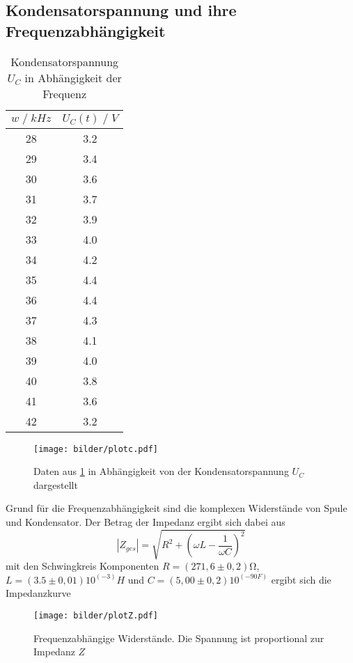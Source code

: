 \subsection{Kondensatorspannung und ihre Frequenzabhängigkeit}
\begin{table}
    \centering
    \begin{tabular}{c c}
        \toprule
        $w\;/\;kHz$ & $U_C(t)\;/\;V$\\
        \midrule
        28      &3.2\\
        29      &3.4\\
        30      &3.6\\
        31      &3.7\\
        32      &3.9\\
        33      &4.0\\
        34      &4.2\\
        35      &4.4\\
        36      &4.4\\
        37      &4.3\\
        38      &4.1\\
        39      &4.0\\
        40      &3.8\\
        41      &3.6\\
        42      &3.2\\
        \bottomrule
    \end{tabular}
    \caption{Kondensatorspannung $U_C$ in Abhängigkeit der Frequenz}
    \label{tab:tabelle_w}
\end{table}
\begin{figure}[H]
    \centering
    \texttt{[image: bilder/plotc.pdf]}
    \caption{
        Daten aus \ref{tab:tabelle_w} in Abhängigkeit von der Kondensatorspannung $U_C$ dargestellt
    }
\end{figure}
Grund für die Frequenzabhängigkeit sind die komplexen Widerstände von Spule und Kondensator.
Der Betrag der Impedanz ergibt sich dabei aus
\begin{equation}
    |Z_{ges}|=\sqrt{R^2+(\omega L-\frac{1}{\omega C})^2}
\end{equation}
mit den Schwingkreis Komponenten $R=(271,6\pm0,2)\si{\ohm}$, $L=(3.5\pm 0,01)10^(-3)H$ und $C=(5,00\pm 0,2)10^(-90F)$ ergibt 
sich die Impedanzkurve
\begin{figure}[H]
    \centering
    \texttt{[image: bilder/plotZ.pdf]}
    \caption{
        Frequenzabhängige Widerstände. Die Spannung ist proportional zur Impedanz $Z$
    }
\end{figure}
\newpage





